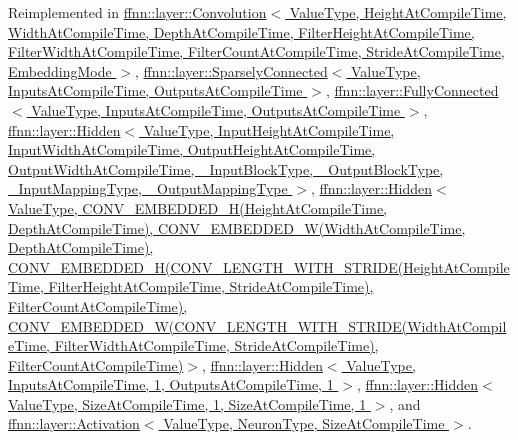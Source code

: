 Reimplemented in \hyperlink{classffnn_1_1layer_1_1_convolution_a332b4eee045e04cee3b5ab47ad3836f1}{ffnn\-::layer\-::\-Convolution$<$ Value\-Type, Height\-At\-Compile\-Time, Width\-At\-Compile\-Time, Depth\-At\-Compile\-Time, Filter\-Height\-At\-Compile\-Time, Filter\-Width\-At\-Compile\-Time, Filter\-Count\-At\-Compile\-Time, Stride\-At\-Compile\-Time, Embedding\-Mode $>$}, \hyperlink{classffnn_1_1layer_1_1_sparsely_connected_a597ea83c83e8f4f64a1fb7f17a1ea015}{ffnn\-::layer\-::\-Sparsely\-Connected$<$ Value\-Type, Inputs\-At\-Compile\-Time, Outputs\-At\-Compile\-Time $>$}, \hyperlink{classffnn_1_1layer_1_1_fully_connected_afd5c1a006cf33a47cb7e2a982fe4cd6d}{ffnn\-::layer\-::\-Fully\-Connected$<$ Value\-Type, Inputs\-At\-Compile\-Time, Outputs\-At\-Compile\-Time $>$}, \hyperlink{classffnn_1_1layer_1_1_hidden_a246152dfed00bbacb94fbbd6712acea0}{ffnn\-::layer\-::\-Hidden$<$ Value\-Type, Input\-Height\-At\-Compile\-Time, Input\-Width\-At\-Compile\-Time, Output\-Height\-At\-Compile\-Time, Output\-Width\-At\-Compile\-Time, \-\_\-\-Input\-Block\-Type, \-\_\-\-Output\-Block\-Type, \-\_\-\-Input\-Mapping\-Type, \-\_\-\-Output\-Mapping\-Type $>$}, \hyperlink{classffnn_1_1layer_1_1_hidden_a246152dfed00bbacb94fbbd6712acea0}{ffnn\-::layer\-::\-Hidden$<$ Value\-Type, C\-O\-N\-V\-\_\-\-E\-M\-B\-E\-D\-D\-E\-D\-\_\-\-H(\-Height\-At\-Compile\-Time, Depth\-At\-Compile\-Time), C\-O\-N\-V\-\_\-\-E\-M\-B\-E\-D\-D\-E\-D\-\_\-\-W(\-Width\-At\-Compile\-Time, Depth\-At\-Compile\-Time), C\-O\-N\-V\-\_\-\-E\-M\-B\-E\-D\-D\-E\-D\-\_\-\-H(\-C\-O\-N\-V\-\_\-\-L\-E\-N\-G\-T\-H\-\_\-\-W\-I\-T\-H\-\_\-\-S\-T\-R\-I\-D\-E(\-Height\-At\-Compile\-Time, Filter\-Height\-At\-Compile\-Time, Stride\-At\-Compile\-Time), Filter\-Count\-At\-Compile\-Time), C\-O\-N\-V\-\_\-\-E\-M\-B\-E\-D\-D\-E\-D\-\_\-\-W(\-C\-O\-N\-V\-\_\-\-L\-E\-N\-G\-T\-H\-\_\-\-W\-I\-T\-H\-\_\-\-S\-T\-R\-I\-D\-E(\-Width\-At\-Compile\-Time, Filter\-Width\-At\-Compile\-Time, Stride\-At\-Compile\-Time), Filter\-Count\-At\-Compile\-Time)$>$}, \hyperlink{classffnn_1_1layer_1_1_hidden_a246152dfed00bbacb94fbbd6712acea0}{ffnn\-::layer\-::\-Hidden$<$ Value\-Type, Inputs\-At\-Compile\-Time, 1, Outputs\-At\-Compile\-Time, 1 $>$}, \hyperlink{classffnn_1_1layer_1_1_hidden_a246152dfed00bbacb94fbbd6712acea0}{ffnn\-::layer\-::\-Hidden$<$ Value\-Type, Size\-At\-Compile\-Time, 1, Size\-At\-Compile\-Time, 1 $>$}, and \hyperlink{classffnn_1_1layer_1_1_activation_a3c4284245343f2132dd28eaf7ffbed47}{ffnn\-::layer\-::\-Activation$<$ Value\-Type, Neuron\-Type, Size\-At\-Compile\-Time $>$}.


